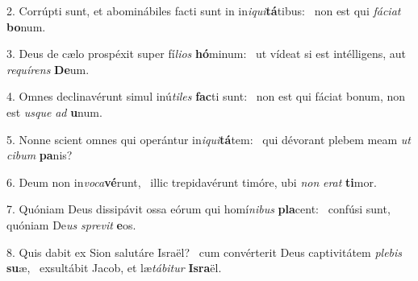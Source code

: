 2. Corrúpti sunt, et abominábiles facti sunt in in\textit{i}\textit{qui}\textbf{tá}tibus: \ast\  non est qui \textit{fá}\textit{ci}\textit{at} \textbf{bo}num.\

3. Deus de cælo prospéxit super fí\textit{li}\textit{os} \textbf{hó}minum: \ast\  ut vídeat si est intélligens, aut \textit{re}\textit{quí}\textit{rens} \textbf{De}um.\

4. Omnes declinavérunt simul inú\textit{ti}\textit{les} \textbf{fac}ti sunt: \ast\  non est qui fáciat bonum, non est \textit{us}\textit{que} \textit{ad} \textbf{u}num.\

5. Nonne scient omnes qui operántur in\textit{i}\textit{qui}\textbf{tá}tem: \ast\  qui dévorant plebem meam \textit{ut} \textit{ci}\textit{bum} \textbf{pa}nis?\

6. Deum non in\textit{vo}\textit{ca}\textbf{vé}runt, \ast\  illic trepidavérunt timóre, ubi \textit{non} \textit{e}\textit{rat} \textbf{ti}mor.\

7. Quóniam Deus dissipávit ossa eórum qui homí\textit{ni}\textit{bus} \textbf{pla}cent: \ast\  confúsi sunt, quóniam De\textit{us} \textit{spre}\textit{vit} \textbf{e}os.\

8. Quis dabit ex Sion salutáre Israël? \dag\  cum convérterit Deus captivitátem \textit{ple}\textit{bis} \textbf{su}æ, \ast\  exsultábit Jacob, et læ\textit{tá}\textit{bi}\textit{tur} \textbf{Is}\textbf{ra}ël.\

